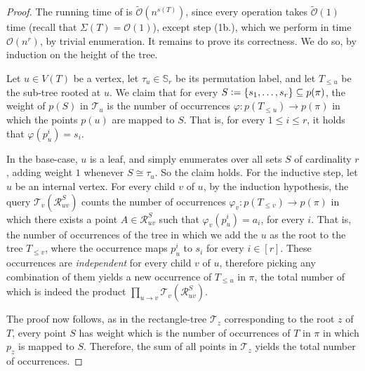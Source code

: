 \documentclass{article}
\newcommand{\eqdef}{\vcentcolon=}
\theoremstyle{remark}
\newcommand{\Otilde}[1]{\widetilde{\mathcal{O}}\left( #1 \right)}
\theoremstyle{plain}
\begin{document}
\begin{proof}
    The running time of  is $\Otilde{n^{s(T)}}$, since every operation takes $\Otilde{1}$ time (recall that $\Sigma(T)=\mathcal{O}(1)$),
    except step (1b.), which we perform in time $\mathcal{O}(n^r)$, by trivial enumeration.
    It remains to prove its correctness. We do so, by induction on the height of the tree.
    
    Let $u \in V(T)$ be a vertex, let $\tau_u \in \mathbb{S}_r$ be its permutation label, and let $T_{\le u}$ be the sub-tree rooted at $u$.
    We claim that for every $S \eqdef \{ s_1, \dots, s_r \} \subseteq p(\pi)$,
    the weight of $p(S)$ in $\mathcal{T}_u$ is the number of occurrences $\varphi: p(T_{\le u}) \to p(\pi)$ in which
    the points $p(u)$ are mapped to $S$.
    That is, for every $1 \le i \le r$, it holds that $\varphi(p_u^i) = s_i$. 

    In the base-case, $u$ is a leaf, and  simply enumerates over all sets $S$ of cardinality $r$,
    adding weight $1$ whenever $S \cong \tau_u$. So the claim holds.
    For the inductive step, let $u$ be an internal vertex.
    For every child $v$ of $u$, by the induction hypothesis, the query $\mathcal{T}_v(\mathcal{R}_{uv}^S)$
    counts the number of occurrences $\varphi_v: p(T_{\le v}) \to p(\pi)$ in which there exists a point $A \in \mathcal{R}_{uv}^S$
    such that $\varphi_v(p_u^i) = a_i$, for every $i$. That is, the number of occurrences of the tree
    in which we add the $u$ as the root to the tree $T_{\le v}$,
    where the occurrence maps $p_u^i$ to $s_i$ for every $i \in [r]$.
    These occurrences are \textit{independent} for every child $v$ of $u$,
    therefore picking any combination of them yields a new occurrence of $T_{\le u}$ in $\pi$, 
    the total number of which is indeed the product $\prod_{u \to v} \mathcal{T}_v(\mathcal{R}_{uv}^S)$.

    The proof now follows, as in the rectangle-tree $\mathcal{T}_z$ corresponding to the root $z$ of $T$,
    every point $S$ has weight which is the number of occurrences of $T$ in $\pi$ in which $p_z$ is mapped to $S$.
    Therefore, the sum of all points in $\mathcal{T}_z$ yields the total number of occurrences.
\end{proof}
\end{document}
